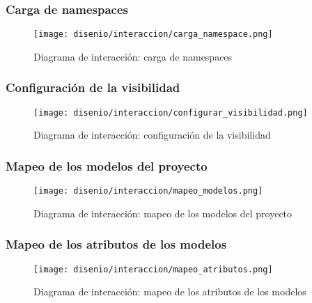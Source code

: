 \newpage

\subsubsection{Carga de namespaces}

\begin{figure}[H]
    \begin{center}
        \texttt{[image: disenio/interaccion/carga\_namespace.png]}
    \end{center}
    \caption{Diagrama de interacción: carga de namespaces}
    \label{fig:carga_namespace}
\end{figure}

\newpage

\subsubsection{Configuración de la visibilidad}

\begin{figure}[H]
    \begin{center}
        \texttt{[image: disenio/interaccion/configurar\_visibilidad.png]}
    \end{center}
    \caption{Diagrama de interacción: configuración de la visibilidad}
    \label{fig:configura_visibilidad}
\end{figure}

\newpage

\subsubsection{Mapeo de los modelos del proyecto}

\begin{figure}[H]
    \begin{center}
        \texttt{[image: disenio/interaccion/mapeo\_modelos.png]}
    \end{center}
    \caption{Diagrama de interacción: mapeo de los modelos del proyecto}
    \label{fig:mapeo_modelos}
\end{figure}

\newpage

\subsubsection{Mapeo de los atributos de los modelos}

\begin{figure}[H]
    \begin{center}
        \texttt{[image: disenio/interaccion/mapeo\_atributos.png]}
    \end{center}
    \caption{Diagrama de interacción: mapeo de los atributos de los modelos}
    \label{fig:mapeo_atributos}
\end{figure}

